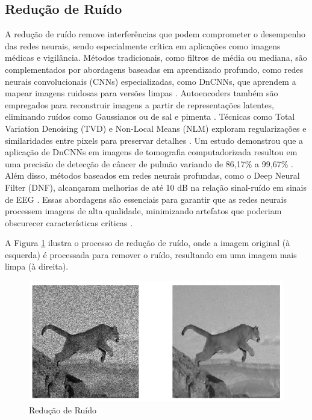 \subsection{Redução de Ruído}
A redução de ruído remove interferências que podem comprometer o desempenho das redes neurais, sendo especialmente crítica em aplicações como imagens médicas e vigilância. Métodos tradicionais, como filtros de média ou mediana, são complementados por abordagens baseadas em aprendizado profundo, como redes neurais convolucionais (CNNs) especializadas, como DnCNNs, que aprendem a mapear imagens ruidosas para versões limpas \cite{sharma2024deep}. Autoencoders também são empregados para reconstruir imagens a partir de representações latentes, eliminando ruídos como Gaussianos ou de sal e pimenta \cite{sharma2024deep}. Técnicas como Total Variation Denoising (TVD) e Non-Local Means (NLM) exploram regularizações e similaridades entre pixels para preservar detalhes \cite{sharma2024deep}. Um estudo demonstrou que a aplicação de DnCNNs em imagens de tomografia computadorizada resultou em uma precisão de detecção de câncer de pulmão variando de 86,17\% a 99,67\% \cite{sharma2024deep}. Além disso, métodos baseados em redes neurais profundas, como o Deep Neural Filter (DNF), alcançaram melhorias de até 10 dB na relação sinal-ruído em sinais de EEG \cite{peer2022real}. Essas abordagens são essenciais para garantir que as redes neurais processem imagens de alta qualidade, minimizando artefatos que poderiam obscurecer características críticas \cite{sharma2024deep}.

A Figura \ref{fig:reducao_de_ruido} ilustra o processo de redução de ruído, onde a imagem original (à esquerda) é processada para remover o ruído, resultando em uma imagem mais limpa (à direita).

\begin{figure}[H]
    \centering
    \caption{\label{fig:reducao_de_ruido}Redução de Ruído}
    \includegraphics[width=1\textwidth]{img/revisao_bibliografica/reducao_de_ruido.png}
\end{figure}

